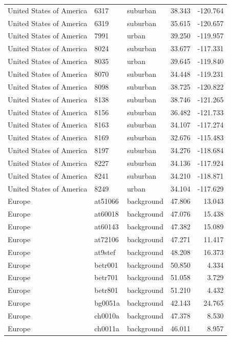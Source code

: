 \documentclass{article}
\begin{document}
\begin{longtable}{lllrr}
United States of America & 6317 & suburban & 38.343 & -120.764 \\ 
United States of America & 6319 & suburban & 35.615 & -120.657 \\ 
United States of America & 7991 & urban & 39.250 & -119.957 \\ 
United States of America & 8024 & suburban & 33.677 & -117.331 \\ 
United States of America & 8035 & urban & 39.645 & -119.840 \\ 
United States of America & 8070 & suburban & 34.448 & -119.231 \\ 
United States of America & 8098 & suburban & 38.725 & -120.822 \\ 
United States of America & 8138 & suburban & 38.746 & -121.265 \\ 
United States of America & 8156 & suburban & 36.482 & -121.733 \\ 
United States of America & 8163 & suburban & 34.107 & -117.274 \\ 
United States of America & 8169 & suburban & 32.676 & -115.483 \\ 
United States of America & 8197 & suburban & 34.276 & -118.684 \\ 
United States of America & 8227 & suburban & 34.136 & -117.924 \\ 
United States of America & 8241 & suburban & 34.210 & -118.871 \\ 
United States of America & 8249 & urban & 34.104 & -117.629 \\ 
Europe & at51066 & background & 47.806 & 13.043 \\ 
Europe & at60018 & background & 47.076 & 15.438 \\ 
Europe & at60143 & background & 47.382 & 15.089 \\ 
Europe & at72106 & background & 47.271 & 11.417 \\ 
Europe & at9stef & background & 48.208 & 16.373 \\ 
Europe & betr001 & background & 50.850 & 4.334 \\ 
Europe & betr701 & background & 51.058 & 3.729 \\ 
Europe & betr801 & background & 51.210 & 4.432 \\ 
Europe & bg0051a & background & 42.143 & 24.765 \\ 
Europe & ch0010a & background & 47.378 & 8.530 \\ 
Europe & ch0011a & background & 46.011 & 8.957 \\ 

\end{longtable}
\end{document}

